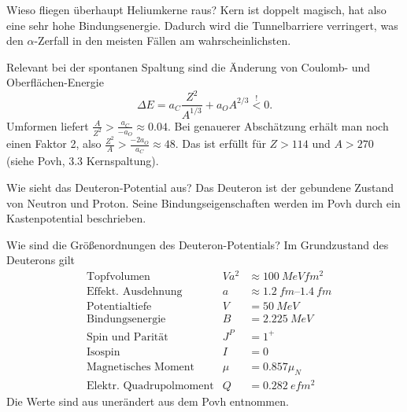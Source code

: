
\begin{fquestion}{Wieso fliegen überhaupt Heliumkerne raus?}
    Kern ist doppelt magisch, hat also eine sehr hohe Bindungsenergie.
    Dadurch wird die Tunnelbarriere verringert, was den $\alpha$-Zerfall in den meisten Fällen am wahrscheinlichsten.
    
    Relevant bei der spontanen Spaltung sind die Änderung von Coulomb- und Oberflächen-Energie
    $$\Delta E = a_C \frac{Z^2}{A^{1/3}} + a_O A^{2/3} \overset{!}{<} 0.$$
    Umformen liefert $\frac{A}{Z^2} > \frac{a_C}{-a_O} \approx 0.04$.
    Bei genauerer Abschätzung erhält man noch einen Faktor 2, also $\frac{Z^2}{A} > \frac{-2a_O}{a_C} \approx 48$.
    Das ist erfüllt für $Z>114$ und $A> 270$ (siehe Povh, 3.3 Kernspaltung).
\end{fquestion}

\begin{fquestion}{Wie sieht das Deuteron-Potential aus?}
    Das Deuteron ist der gebundene Zustand von Neutron und Proton.
    Seine Bindungseigenschaften werden im Povh durch ein Kastenpotential beschrieben.
\end{fquestion}


\begin{fquestion}{Wie sind die Größenordnungen des Deuteron-Potentials?}
    Im Grundzustand des Deuterons gilt
    {
    \begin{align*}
        & \text{Topfvolumen} & Va^2 &\approx \SI{100}{MeV fm^2} \\
        & \text{Effekt. Ausdehnung} & a &\approx \SIrange{1.2}{1.4}{fm} \\
        & \text{Potentialtiefe} & V &= \SI{50}{MeV} \\
         &\text{Bindungsenergie} &  B &=\SI{2.225}{MeV} \\
        &\text{Spin und Parität} & J^P &= 1^+ \\
        &\text{Isospin} & I &= 0 \\
        &\text{Magnetisches Moment} & \mu &= 0.857 \mu_N \\
        &\text{Elektr. Quadrupolmoment} & Q&=\SI{0.282}{e fm^2}
    \end{align*}
    }
    Die Werte sind aus unerändert aus dem Povh entnommen.
\end{fquestion}

